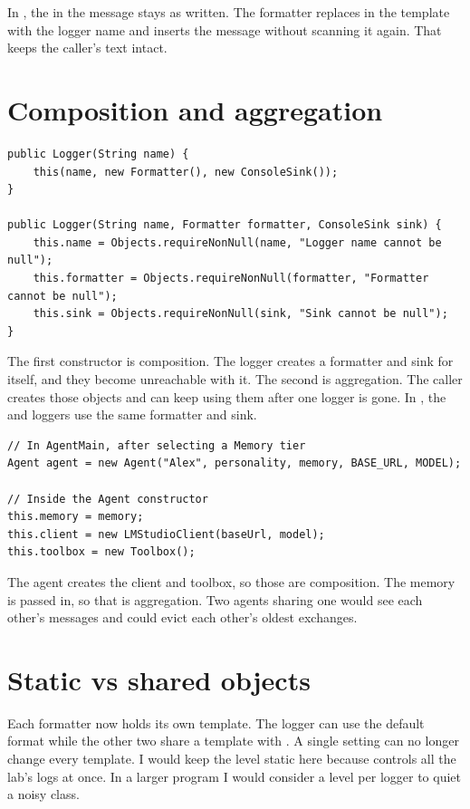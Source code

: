 In , the  in the message stays as written. The formatter replaces  in the template with the logger name and inserts the message without scanning it again. That keeps the caller's text intact.

\section{Composition and aggregation}
\begin{lstlisting}
public Logger(String name) {
    this(name, new Formatter(), new ConsoleSink());
}

public Logger(String name, Formatter formatter, ConsoleSink sink) {
    this.name = Objects.requireNonNull(name, "Logger name cannot be null");
    this.formatter = Objects.requireNonNull(formatter, "Formatter cannot be null");
    this.sink = Objects.requireNonNull(sink, "Sink cannot be null");
}
\end{lstlisting}
The first constructor is composition. The logger creates a formatter and sink for itself, and they become unreachable with it. The second is aggregation. The caller creates those objects and can keep using them after one logger is gone. In , the  and  loggers use the same formatter and sink.

\begin{lstlisting}
// In AgentMain, after selecting a Memory tier
Agent agent = new Agent("Alex", personality, memory, BASE_URL, MODEL);

// Inside the Agent constructor
this.memory = memory;
this.client = new LMStudioClient(baseUrl, model);
this.toolbox = new Toolbox();
\end{lstlisting}
The agent creates the client and toolbox, so those are composition. The memory is passed in, so that is aggregation. Two agents sharing one  would see each other's messages and could evict each other's oldest exchanges.

\section{Static vs shared objects}
Each formatter now holds its own template. The  logger can use the default format while the other two share a template with . A single setting can no longer change every template. I would keep the level static here because  controls all the lab's logs at once. In a larger program I would consider a level per logger to quiet a noisy class.

